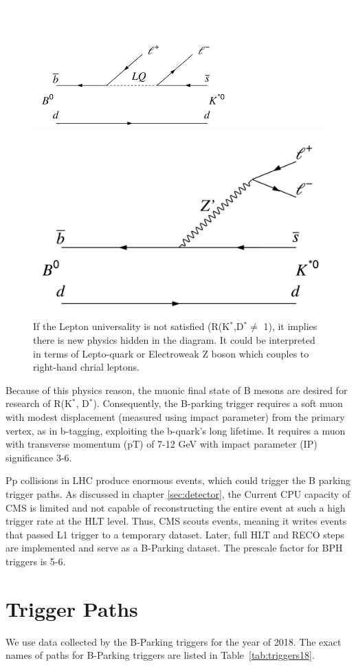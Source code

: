\begin{figure}[h!]
  \caption{If the Lepton universality is not satisfied (R(K$^{*}$,D$^{*} \neq$ 1), it implies there is new physics hidden in the diagram. It could be interpreted in terms of Lepto-quark or Electroweak Z boson which couples to right-hand chrial leptons.}
  \label{fig:LU2}
  \centering
  \includegraphics[width=0.57\linewidth]{figs/LU2.png}
  \includegraphics[width=0.57\linewidth]{figs/LU4.png}
\end{figure}
Because of this physics reason, the muonic final state of B mesons are desired for research of R(K$^{*}$, D$^{*}$).
Consequently, the B-parking trigger requires a soft muon with modest displacement (measured using impact parameter) from the primary vertex, as in b-tagging, exploiting the b-quark's long lifetime.
It requires a muon with transverse momentum (pT) of 7-12 GeV with impact parameter (IP) significance 3-6.

Pp collisions in LHC produce enormous events, which could trigger the B parking trigger paths.
 As discussed in chapter \ref{sec:detector}, the Current CPU capacity of CMS is limited and not capable of reconstructing the entire event at such a high trigger rate at the HLT level.
Thus, CMS scouts events, meaning it writes events that passed L1 trigger to a temporary dataset. Later, full HLT and RECO steps are implemented and serve as a B-Parking dataset.
The prescale factor for BPH triggers is 5-6.

\section{Trigger Paths}
We use data collected by the B-Parking triggers for the year of 2018.
The exact names of paths for B-Parking triggers are listed in Table~\ref{tab:triggers18}.

